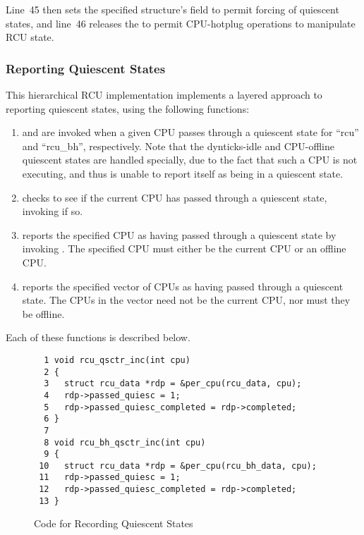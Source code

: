 Line~45 then sets the specified  structure's 
field to permit forcing of quiescent states, and
line~46 releases the  to permit CPU-hotplug
operations to manipulate RCU state.

\subsubsection{Reporting Quiescent States}
\label{app:rcuimpl:rcutreewt:Reporting Quiescent States}

This hierarchical RCU implementation implements a layered approach
to reporting quiescent states, using the following functions:
\begin{enumerate}
\item	{} and 
	are invoked when a given CPU passes through a
	quiescent state for ``rcu'' and ``rcu\_bh'', respectively.
	Note that the dynticks-idle and CPU-offline quiescent states
	are handled specially, due to the fact that such a CPU
	is not executing, and thus is unable to report itself as
	being in a quiescent state.
\item	{} checks to see if the current
	CPU has passed through a quiescent state, invoking 
	if so.
\item	{} reports the specified CPU as having passed
	through a quiescent state by invoking .
	The specified CPU must either be the current CPU or an offline CPU.
\item	{} reports the specified vector of CPUs as
	having passed through a quiescent state.  The CPUs in the
	vector need not be the current CPU, nor must they be offline.
\end{enumerate}

Each of these functions is described below.

\begin{figure}[tbp]
{ \scriptsize
\begin{verbatim}
  1 void rcu_qsctr_inc(int cpu)
  2 {
  3   struct rcu_data *rdp = &per_cpu(rcu_data, cpu);
  4   rdp->passed_quiesc = 1;
  5   rdp->passed_quiesc_completed = rdp->completed;
  6 }
  7
  8 void rcu_bh_qsctr_inc(int cpu)
  9 {
 10   struct rcu_data *rdp = &per_cpu(rcu_bh_data, cpu);
 11   rdp->passed_quiesc = 1;
 12   rdp->passed_quiesc_completed = rdp->completed;
 13 }
\end{verbatim}
}
\caption{Code for Recording Quiescent States}
\label{fig:app:rcuimpl:rcutreewt:Code for Recording Quiescent States}
\end{figure}


